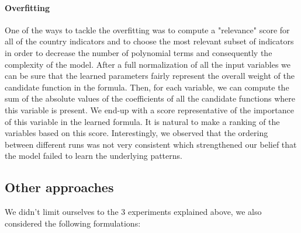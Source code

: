 \documentclass[12pt, letterpaper]{article}
\begin{document}
\paragraph{Overfitting}
One of the ways to tackle the overfitting was to compute a "relevance" score for all of the country indicators and to choose the most relevant subset of 
indicators in order to decrease the number of polynomial terms and consequently the complexity of the model. 
After a full normalization of all the input variables we can be sure that the learned parameters fairly represent the overall weight of the candidate function in the formula. 
Then, for each variable, we can compute the sum of the absolute values of the coefficients of all the candidate functions where this variable is present.
We end-up with a score representative of the importance of this variable in the learned formula. 
It is natural to make a ranking of the variables based on this score. 
Interestingly, we observed that the ordering between different runs was not very consistent which strengthened our belief that the model failed to learn the underlying patterns.


\subsection{Other approaches}

We didn't limit ourselves to the 3 experiments explained above, we also considered the following formulations:
\end{document}

